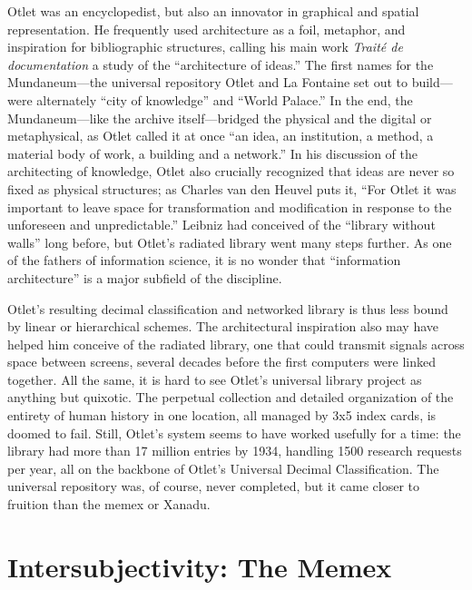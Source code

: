 Otlet was an encyclopedist, but also an innovator in graphical and spatial representation. He frequently used architecture as a foil, metaphor, and inspiration for bibliographic structures, calling his main work \emph{Trait\'{e} de documentation} a study of the ``architecture of ideas.''\autocite[129]{van_de_heuvel_building_2008} The first names for the Mundaneum---the universal repository Otlet and La Fontaine set out to build---were alternately ``city of knowledge'' and ``World Palace.'' In the end, the Mundaneum---like the archive itself---bridged the physical and the digital or metaphysical, as Otlet called it at once ``an idea, an institution, a method, a material body of work, a building and a network.''\autocite[130]{van_de_heuvel_building_2008} In his discussion of the architecting of knowledge, Otlet also crucially recognized that ideas are never so fixed as physical structures; as Charles van den Heuvel puts it, ``For Otlet it was important to leave space for transformation and modification in response to the unforeseen and unpredictable.''\autocite[131]{van_de_heuvel_building_2008} Leibniz had conceived of the ``library without walls'' long before, but Otlet's radiated library went many steps further. As one of the fathers of information science, it is no wonder that ``information architecture'' is a major subfield of the discipline.

Otlet's resulting decimal classification and networked library is thus less bound by linear or hierarchical schemes. The architectural inspiration also may have helped him conceive of the radiated library, one that could transmit signals across space between screens, several decades before the first computers were linked together. All the same, it is hard to see Otlet's universal library project as anything but quixotic. The perpetual collection and detailed organization of the entirety of human history in one location, all managed by 3x5 index cards, is doomed to fail. Still, Otlet's system seems to have worked usefully for a time: the library had more than 17 million entries by 1934, handling 1500 research requests per year, all on the backbone of Otlet's Universal Decimal Classification.\autocite{_limited_2001} The universal repository was, of course, never completed, but it came closer to fruition than the memex or Xanadu.


\section{Intersubjectivity: The Memex}

